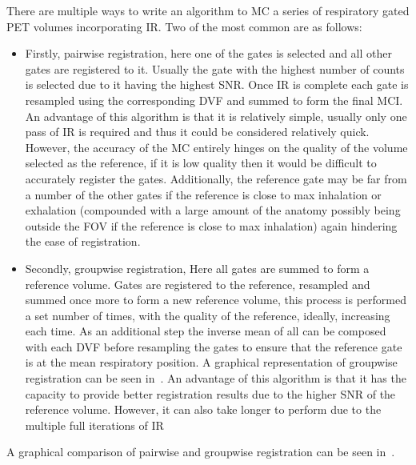             There are multiple ways to write an algorithm to \gls{MC} a series of respiratory gated \gls{PET} volumes incorporating \gls{IR}. Two of the most common are as follows:
            
            \begin{itemize}
                \item Firstly, pairwise registration, here one of the gates is selected and all other gates are registered to it. Usually the gate with the highest number of counts is selected due to it having the highest \gls{SNR}. Once \gls{IR} is complete each gate is resampled using the corresponding \gls{DVF} and summed to form the final \gls{MCI}. An advantage of this algorithm is that it is relatively simple, usually only one pass of \gls{IR} is required and thus it could be considered relatively quick. However, the accuracy of the \gls{MC} entirely hinges on the quality of the volume selected as the reference, if it is low quality then it would be difficult to accurately register the gates. Additionally, the reference gate may be far from a number of the other gates if the reference is close to max inhalation or exhalation (compounded with a large amount of the anatomy possibly being outside the \gls{FOV} if the reference is close to max inhalation) again hindering the ease of registration.
                
                \item Secondly, groupwise registration, Here all gates are summed to form a reference volume. Gates are registered to the reference, resampled and summed once more to form a new reference volume, this process is performed a set number of times, with the quality of the reference, ideally, increasing each time. As an additional step the inverse mean of all  can be composed with each \gls{DVF} before resampling the gates to ensure that the reference gate is at the mean respiratory position. A graphical representation of groupwise registration can be seen in~. An advantage of this algorithm is that it has the capacity to provide better registration results due to the higher \gls{SNR} of the reference volume. However, it can also take longer to perform due to the multiple full iterations of \gls{IR}
            \end{itemize}
            
            A graphical comparison of pairwise and groupwise registration can be seen in~.
            
